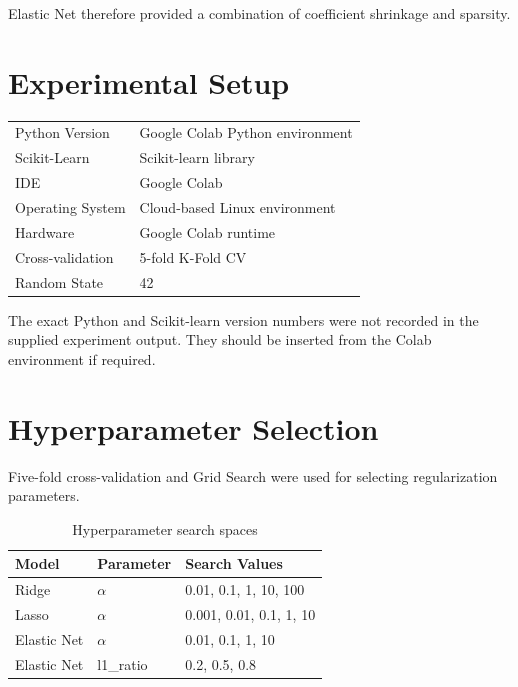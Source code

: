 \documentclass[12pt,a4paper]{article}
\begin{document}
Elastic Net therefore provided a combination of coefficient shrinkage and sparsity.

\section{Experimental Setup}

\begin{tabular}{ll}
\toprule
Python Version & Google Colab Python environment \\
Scikit-Learn & Scikit-learn library \\
IDE & Google Colab \\
Operating System & Cloud-based Linux environment \\
Hardware & Google Colab runtime \\
Cross-validation & 5-fold K-Fold CV \\
Random State & 42 \\
\bottomrule
\end{tabular}

The exact Python and Scikit-learn version numbers were not recorded in the supplied experiment output. They should be inserted from the Colab environment if required.

\section{Hyperparameter Selection}

Five-fold cross-validation and Grid Search were used for selecting regularization parameters.

\begin{table}[H]
\centering
\caption{Hyperparameter search spaces}
\begin{tabular}{lll}
\toprule
\textbf{Model} & \textbf{Parameter} & \textbf{Search Values} \\
\midrule
Ridge & $\alpha$ & 0.01, 0.1, 1, 10, 100 \\
Lasso & $\alpha$ & 0.001, 0.01, 0.1, 1, 10 \\
Elastic Net & $\alpha$ & 0.01, 0.1, 1, 10 \\
Elastic Net & l1\_ratio & 0.2, 0.5, 0.8 \\
\bottomrule
\end{tabular}
\end{table}
\end{document}
